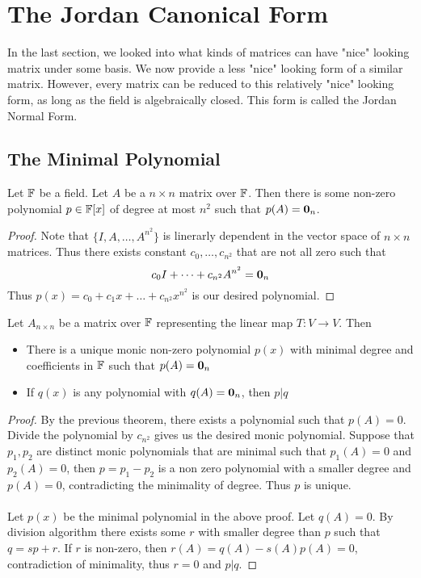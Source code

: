 \documentclass[a4paper]{article}
\begin{document}
\pagebreak
\section{The Jordan Canonical Form}
In the last section, we looked into what kinds of matrices can have "nice" looking matrix under some basis. We now provide a less "nice" looking form of a similar matrix. However, every matrix can be reduced to this relatively "nice" looking form, as long as the field is algebraically closed. This form is called the Jordan Normal Form. 

\subsection{The Minimal Polynomial}
\begin{thm}{}{} Let $\mathbb{F}$ be a field. Let $A$ be a $n\times n$ matrix over $\mathbb{F}$. Then there is some non-zero polynomial $p\in\mathbb{F}[x]$ of degree at most $n^2$ such that $p(A)=\vb{0}_n$. \tcbline\begin{proof} Note that $\{I,A,\dots,A^{n^2}\}$ is linerarly dependent in the vector space of $n\times n$ matrices. Thus there exists constant $c_0,\dots,c_{n^2}$ that are not all zero such that $$c_0I+\dots+c_{n^2}A^{n^2}=\vb{0}_n$$ Thus $p(x)=c_0+c_1x+\dots+c_{n^2}x^{n^2}$ is our desired polynomial. 
\end{proof}
\end{thm}

\begin{thm}{}{} Let $A_{n\times n}$ be a matrix over $\mathbb{F}$ representing the linear map $T:V\to V$. Then 
\begin{itemize}
\item There is a unique monic non-zero polynomial $p(x)$ with minimal degree and coefficients in $\mathbb{F}$ such that $p(A)=\vb{0}_n$
\item If $q(x)$ is any polynomial with $q(A)=\vb{0}_n$, then $p|q$
\end{itemize}\tcbline\begin{proof} By the previous theorem, there exists a polynomial such that $p(A)=0$. Divide the polynomial by $c_{n^2}$ gives us the desired monic polynomial. Suppose that $p_1,p_2$ are distinct monic polynomials that are minimal such that $p_1(A)=0$ and $p_2(A)=0$, then $p=p_1-p_2$ is a non zero polynomial with a smaller degree and $p(A)=0$, contradicting the minimality of degree. Thus $p$ is unique. \\~\\
Let $p(x)$ be the minimal polynomial in the above proof. Let $q(A)=0$. By division algorithm there exists some $r$ with smaller degree than $p$ such that $q=sp+r$. If $r$ is non-zero, then $r(A)=q(A)-s(A)p(A)=0$, contradiction of minimality, thus $r=0$ and $p|q$. 
\end{proof}
\end{thm}
\end{document}
